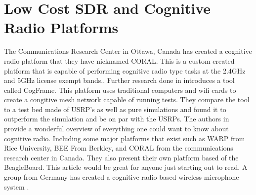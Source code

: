 \section{Low Cost SDR and Cognitive Radio Platforms}

The Communications Research Center in Ottawa, Canada has created a cognitive radio platform that they have nicknamed CORAL. This is a custom created platform that is capable of performing cognitive radio
type tasks at the 2.4GHz and 5GHz license exempt bands.\cite{5457842}. Further research done in \cite{6654982} introduces a tool called CogFrame. This platform uses traditional computers and wifi cards
to create a congitive mesh network capable of running tests. They compare the tool to a test bed made of USRP's as well as pure simulations and found it to outperform the simulation and be on par with the
USRPs. The authors in \cite{6421105} provide a wonderful overview of everything one could want to know about cognitive radio. Including some major platforms that exist such as WARP from Rice University,
BEE From Berkley, and CORAL from the communications research center in Canada. They also present their own platform based of the BeagleBoard. This article would be great for anyone just starting out to
read. A group from Germany has created a cognitive radio based wireless microphone system \cite{6100954}. 
